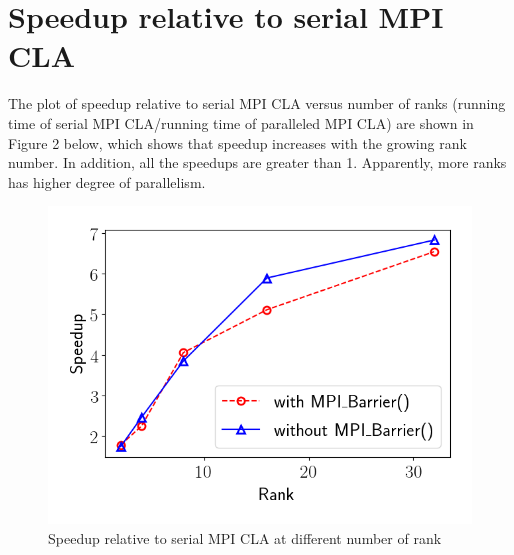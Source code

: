 \documentclass{article}
\begin{document}
\newpage
\section{Speedup relative to serial MPI CLA}
The plot of speedup relative to serial MPI CLA versus number of ranks (running time of serial MPI CLA/running time of paralleled MPI CLA) are shown in Figure 2 below, which shows that speedup increases with the growing rank number. In addition, all the speedups are greater than 1. Apparently, more ranks has higher degree of parallelism.
\begin{figure}[!htb]
	\centering   
	\includegraphics[scale=0.5]{../plot/speedup_rel_MPI_CLA.png}
	\caption{Speedup relative to serial MPI CLA at different number of rank}
\end{figure}
\end{document}
